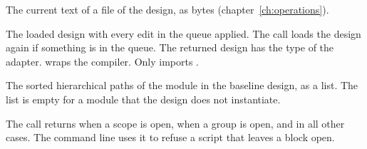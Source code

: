\begin{entry}{}
\item[Returns] The current text of a file of the design, as bytes (chapter~\ref{ch:operations}).
\end{entry}

\begin{entry}{}
\item[Returns] The loaded design with every edit in the queue applied. The call loads the
  design again if something is in the queue. The returned design has the type  of the
  adapter.  wraps the compiler. Only  imports
  .
\end{entry}

\begin{entry}{}
\item[Returns] The sorted hierarchical paths of the module in the baseline design, as a
  list. The list is empty for a module that the design does not instantiate.
\end{entry}

\begin{entry}{}
\item[Returns] The call returns  when a scope is open,
   when a group is open, and  in all other cases. The command
  line uses it to refuse a script that leaves a block open.
\end{entry}

